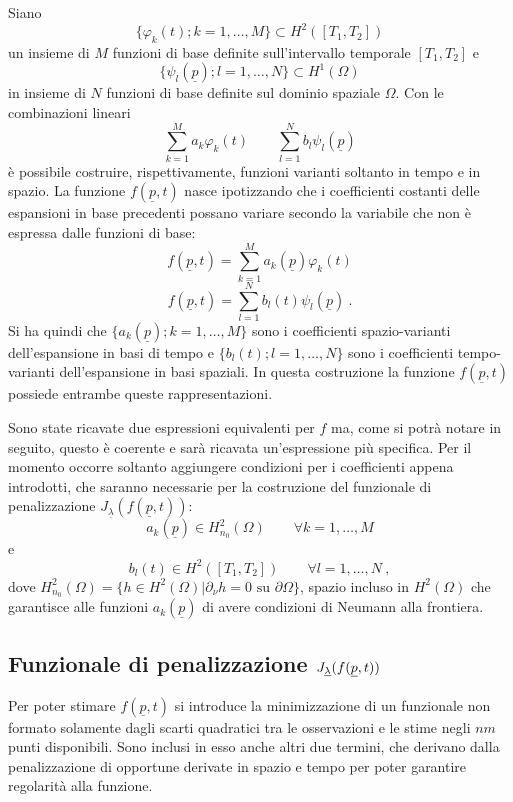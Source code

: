 \documentclass[a4paper,11pt,twoside,openright]{book}							%
\begin{document}
Siano 
$$
\{ \varphi_k(t);k=1, \ldots , M \} \subset H^2([T_1,T_2])
$$
un insieme di $M$ funzioni di base definite sull'intervallo temporale $[T_1,T_2]$ e
$$
\{ \psi_l(\underline p);l=1, \ldots , N \} \subset H^1(\Omega)
$$
in insieme di $N$ funzioni di base definite sul dominio spaziale $\Omega$. Con le combinazioni lineari
$$
\sum_{k=1}^M a_k\varphi_k(t) \qquad \sum_{l=1}^N b_l\psi_l(\underline p)
$$
è possibile costruire, rispettivamente, funzioni varianti soltanto in tempo e in spazio. La funzione $f(\underline p,t)$ nasce ipotizzando che i coefficienti costanti delle espansioni in base precedenti possano variare secondo la variabile che non è espressa dalle funzioni di base:
\begin{equation} 
\label{eq:f_temp}
f(\underline p, t) = \sum_{k=1}^M a_k(\underline p)\varphi_k(t)
\end{equation}
\begin{equation}
\label{eq:f_space}
f(\underline p, t) = \sum_{l=1}^N b_l(t)\psi_l(\underline p) \ .
\end{equation}
Si ha quindi che $\{ a_k(\underline p);k=1, \ldots , M \}$ sono i coefficienti spazio-varianti dell'espansione in basi di tempo e $\{ b_l(t);l=1, \ldots , N \}$ sono i coefficienti tempo-varianti dell'espansione in basi spaziali. In questa costruzione la funzione $f(\underline p,t)$ possiede entrambe queste rappresentazioni.

Sono state ricavate due espressioni equivalenti per $f$ ma, come si potrà notare in seguito, questo è coerente e sarà ricavata un'espressione più specifica. Per il momento occorre soltanto aggiungere condizioni per i coefficienti appena introdotti, che saranno necessarie per la costruzione del funzionale di penalizzazione $J_{\underline \lambda }(f(\underline p,t))$:
$$
a_k(\underline p) \in H_{n_0}^2(\Omega) \qquad \forall k=1, \ldots , M
$$
e
$$
b_l(t) \in H^2([T_1,T_2]) \qquad \forall l=1, \ldots , N \ ,
$$
dove $H^2_{n_0}(\Omega) = \{h \in H^2(\Omega) | \partial _{\nu}h=0 \mbox{ su } \partial \Omega\}$, spazio incluso in $H^2(\Omega)$ che garantisce alle funzioni $a_k(\underline p)$ di avere condizioni di Neumann alla frontiera.


\subsection{Funzionale di penalizzazione $J_{\protect\underline{\lambda}}(f(\protect\underline{p},t))$}

Per poter stimare $f(\underline p,t)$ si introduce la minimizzazione di un funzionale non formato solamente dagli scarti quadratici tra le osservazioni e le stime negli $nm$ punti disponibili. Sono inclusi in esso anche altri due termini, che derivano dalla penalizzazione di opportune derivate in spazio e tempo per poter garantire regolarità alla funzione.
\end{document}

